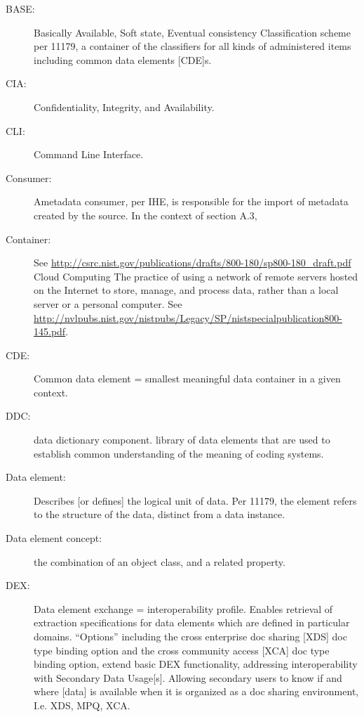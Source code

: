 \begin{description}
\item[BASE:] Basically Available, Soft state, Eventual consistency
  Classification scheme per 11179, a container of the classifiers for
  all kinds of administered items including common data elements
  [CDE]s.

\item[CIA:] Confidentiality, Integrity, and Availability.

\item[CLI:] Command Line Interface.

\item[Consumer:] Ametadata consumer, per IHE, is responsible for the
  import of metadata created by the source. In the context of section
  A.3,

\item[Container:] See
  \url{http://csrc.nist.gov/publications/drafts/800-180/sp800-180_draft.pdf}
  Cloud Computing The practice of using a network of remote servers
  hosted on the Internet to store, manage, and process data, rather
  than a local server or a personal computer. See
  \url{http://nvlpubs.nist.gov/nistpubs/Legacy/SP/nistspecialpublication800-145.pdf}.

\item[CDE:] Common data element = smallest meaningful data container
  in a given context.

\item[DDC:] data dictionary component. library of data elements that
  are used to establish common understanding of the meaning of coding
  systems.

\item[Data element:] Describes [or defines] the logical unit of
  data. Per 11179, the element refers to the structure of the data,
  distinct from a data instance.

\item[Data element concept:] the combination of an object class, and a
  related property.

\item[DEX:] Data element exchange = interoperability profile. Enables
  retrieval of extraction specifications for data elements which are
  defined in particular domains. “Options” including the cross
  enterprise doc sharing [XDS] doc type binding option and the cross
  community access [XCA] doc type binding option, extend basic DEX
  functionality, addressing interoperability with Secondary Data
  Usage[s]. Allowing secondary users to know if and where [data] is
  available when it is organized as a doc sharing environment,
  I.e. XDS, MPQ, XCA.


\end{description}
